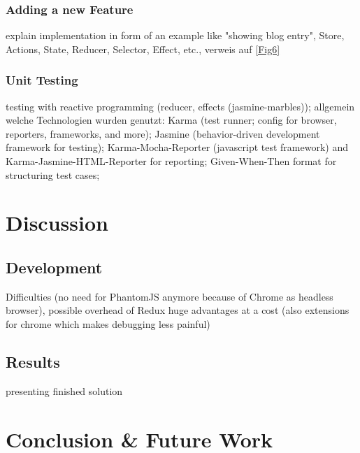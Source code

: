 \documentclass[Bachelor,BIF,english]{twbook}
\newcommand{\FHTWCitationType}{IEEE} %
\begin{document}
\subsection{Adding a new Feature}
explain implementation in form of an example like "showing blog entry", Store, Actions, State, Reducer, Selector, Effect, etc., verweis auf \ref{Fig6}

\subsection{Unit Testing}
testing with reactive programming (reducer, effects (jasmine-marbles)); allgemein welche Technologien wurden genutzt: Karma \cite{Karma} (test runner; config for browser, reporters, frameworks, and more); Jasmine \cite{Jasmine} (behavior-driven development framework for testing); Karma-Mocha-Reporter \cite{KarmaMocha} (javascript test framework) and Karma-Jasmine-HTML-Reporter \cite{KarmaJasmineHTML} for reporting; Given-When-Then \cite{GivenWhenThen} format for structuring test cases; 

\clearpage


\chapter{Discussion}

\section{Development}
Difficulties (no need for PhantomJS anymore because of Chrome as headless browser), possible overhead of Redux huge advantages at a cost (also extensions for chrome which makes debugging less painful)

\section{Results}
presenting finished solution
\clearpage


\chapter{Conclusion \& Future Work}




\clearpage
\ifthenelse{\equal{\FHTWCitationType}{HARVARD}}{}{}

\clearpage

\listoffigures
\clearpage
\end{document}
